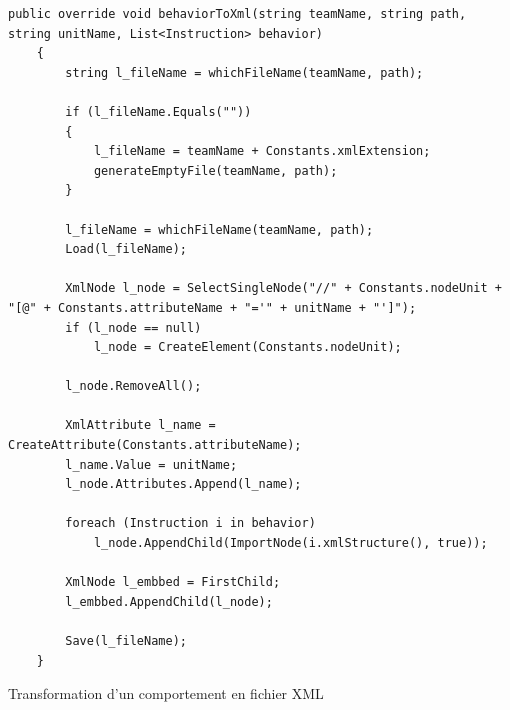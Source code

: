 \documentclass{report}
\begin{document}
\begin{lstlisting}[frame=single]
  public override void behaviorToXml(string teamName, string path, string unitName, List<Instruction> behavior)
    {
        string l_fileName = whichFileName(teamName, path);

        if (l_fileName.Equals(""))
        {
            l_fileName = teamName + Constants.xmlExtension;
            generateEmptyFile(teamName, path);
        }

        l_fileName = whichFileName(teamName, path);
        Load(l_fileName);

        XmlNode l_node = SelectSingleNode("//" + Constants.nodeUnit + "[@" + Constants.attributeName + "='" + unitName + "']");
        if (l_node == null)
            l_node = CreateElement(Constants.nodeUnit);

        l_node.RemoveAll();

        XmlAttribute l_name = CreateAttribute(Constants.attributeName);
        l_name.Value = unitName;
        l_node.Attributes.Append(l_name);

        foreach (Instruction i in behavior)
            l_node.AppendChild(ImportNode(i.xmlStructure(), true));

        XmlNode l_embbed = FirstChild;
        l_embbed.AppendChild(l_node);

        Save(l_fileName);
    }
\end{lstlisting}
 {Transformation d’un comportement en fichier XML}
\end{document}
